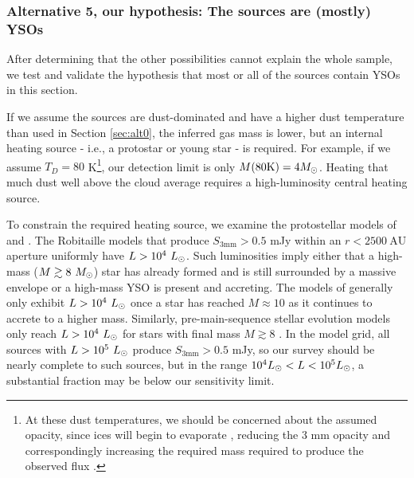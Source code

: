 \documentclass[twocolumn]{aastex61}
\begin{document}
\subsubsection{Alternative 5, our hypothesis: The sources are (mostly) YSOs}
\label{sec:theyareprotostars}
After determining that the other possibilities cannot explain
the whole sample, we test and validate the hypothesis
that most or all of the sources contain YSOs in this section.

If we assume the sources are dust-dominated and have a higher dust temperature
than used in Section \ref{sec:alt0}, the inferred gas mass is lower, but an
internal heating source - i.e., a protostar or young star - is required.  For
example, if we assume $T_D=80$ K\footnote{At these dust temperatures, we should
be concerned about the assumed opacity, since ices will begin to evaporate
\citep[e.g.,][]{Bergin1995a}, reducing the 3 mm opacity and correspondingly
increasing the required mass required to produce the observed flux
\citep{Ossenkopf1994a}.  }, our detection limit is only $M(80\mathrm{K}) = 4
M_{\odot}$.  Heating that much dust well above the cloud average requires a
high-luminosity central heating source.

To constrain the required heating source, we examine the protostellar models of
\citet[][specifically, the \texttt{spubhmi} and \texttt{spubsmi}
models]{Robitaille2017a} and \citet{Zhang2015f}.  The Robitaille models that
produce $S_{3 \mathrm{mm}} > 0.5$ mJy within an $r<2500\mathrm{~AU}$ aperture
uniformly have
${L>10^4~L_{\odot}}$.  Such luminosities imply either that a high-mass
(${M\gtrsim8~M_{\odot}}$) star has already formed and is still surrounded by a
massive envelope or a high-mass YSO is present and accreting.
The models of \citet{Zhang2015f} generally only exhibit $L>10^4~L_{\odot}$ once a star has reached $M\approx10$ \msun as it continues to accrete to
a higher mass.  Similarly, pre-main-sequence stellar evolution models
\citep[e.g.,][]{Haemmerle2013a} only reach $L>10^4~L_{\odot}$ for stars with
final mass $M\gtrsim8$ \msun.  In the \citet{Robitaille2017a} model grid,
all sources with $L>10^5~L_{\odot}$ produce $S_{3 \textrm{mm}}>0.5$ mJy,
so our survey should be nearly complete to such sources, but in the range $10^4
L_{\odot} < L < 10^5 L_{\odot}$, a substantial fraction may be below our sensitivity
limit.
\end{document}
